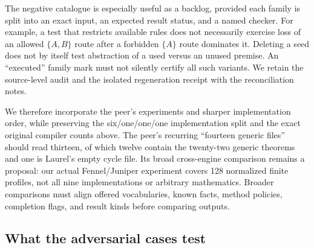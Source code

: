 \documentclass[11pt,letterpaper]{article}
\theoremstyle{definition}\newtheorem{definition}[proposition]{Definition}
\theoremstyle{remark}\newtheorem{remark}[proposition]{Remark}
\begin{document}
The negative catalogue is especially useful as a backlog, provided each family
is split into an exact input, an expected result status, and a named checker.
For example, a test that restricts available rules does not necessarily exercise
loss of an allowed $\{A,B\}$ route after a forbidden $\{A\}$ route dominates
it. Deleting a seed does not by itself test abstraction of a used versus an
unused premise. An ``executed'' family mark must not silently certify all
such variants. We retain the source-level audit and the isolated regeneration
receipt with the reconciliation notes.

We therefore incorporate the peer's experiments and sharper implementation
order, while preserving the six/one/one/one implementation split and the exact
original compiler counts above. The peer's recurring ``fourteen generic
files'' should read thirteen, of which twelve contain the twenty-two generic
theorems and one is Laurel's empty cycle file. Its broad cross-engine
comparison remains a proposal: our actual Fennel/Juniper experiment covers
128 normalized finite profiles, not all nine implementations or arbitrary
mathematics. Broader comparisons must align offered vocabularies, known facts,
method policies, completion flags, and result kinds before comparing outputs.

\subsection{What the adversarial cases test}
\end{document}
